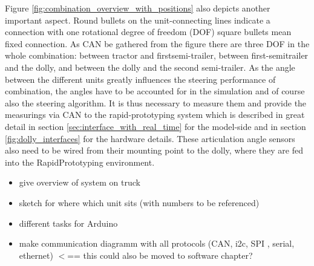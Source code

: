\documentclass[ExampleMasters.tex]{subfiles}
\begin{document}
Figure \ref{fig:combination_overview_with_positions} also depicts another important aspect. Round bullets on the unit-connecting lines indicate a connection with one rotational degree of freedom (DOF) square bullets mean fixed connection. As \gls{CAN} be gathered from the figure there are three DOF in the whole combination: between tractor and firstsemi-trailer, between first-semitrailer and the dolly, and between the dolly and the second semi-trailer. As the angle between the different units greatly influences the steering performance of combination, the angles have to be accounted for in the simulation and of course also the steering algorithm. It is thus necessary to measure them and provide the measurings via \gls{CAN} to the rapid-prototyping system which is described in great detail in section \ref{sec:interface_with_real_time} for the model-side and in section \ref{fig:dolly_interfaces} for the hardware details. These articulation angle sensors also need to be wired from their mounting point to the dolly, where they are fed into the RapidPrototyping environment. 


\begin{itemize}
	\item give overview of system on truck
	\item sketch for where which unit sits (with numbers to be referenced)
	\item different tasks for Arduino
	\item make communication diagramm with all protocols (CAN, i2c, \gls{SPI} , serial, ethernet) $<$== this could also be moved to software chapter?
	
\end{itemize}
\end{document}
